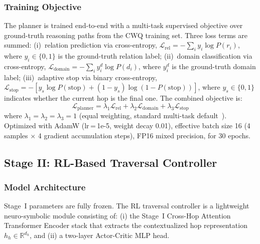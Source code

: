 \documentclass[10pt,conference]{IEEEtran}
\begin{document}
\subsubsection{Training Objective}

The planner is trained end-to-end with a multi-task supervised objective over ground-truth reasoning paths from the CWQ training set. Three loss terms are summed: (i)~relation prediction via cross-entropy, $\mathcal{L}_{\text{rel}} = -\sum_i y_i \log P(r_i)$, where $y_i \in \{0,1\}$ is the ground-truth relation label; (ii)~domain classification via cross-entropy, $\mathcal{L}_{\text{domain}} = -\sum_i y_i^d \log P(d_i)$, where $y_i^d$ is the ground-truth domain label; (iii)~adaptive stop via binary cross-entropy, $\mathcal{L}_{\text{stop}} = -[y_s \log P(\text{stop}) + (1-y_s)\log(1-P(\text{stop}))]$, where $y_s \in \{0,1\}$ indicates whether the current hop is the final one. The combined objective is:
\begin{equation}
\mathcal{L}_{\text{planner}} = \lambda_1 \mathcal{L}_{\text{rel}} + \lambda_2 \mathcal{L}_{\text{domain}} + \lambda_3 \mathcal{L}_{\text{stop}}
\end{equation}
where $\lambda_1=\lambda_2=\lambda_3=1$ (equal weighting, standard multi-task default~\cite{liu2019roberta}). Optimized with AdamW (lr\,=\,1e-5, weight decay 0.01), effective batch size 16 (4 samples $\times$ 4 gradient accumulation steps), FP16 mixed precision, for 30 epochs.

\subsection{Stage II: RL-Based Traversal Controller}

\subsubsection{Model Architecture}

Stage~I parameters are fully frozen. The RL traversal controller is a lightweight neuro-symbolic module consisting of: (i) the Stage~I Cross-Hop Attention Transformer Encoder stack that extracts the contextualized hop representation $h_h \in \mathbb{R}^{d_h}$, and (ii) a two-layer Actor-Critic MLP head. 
\end{document}
